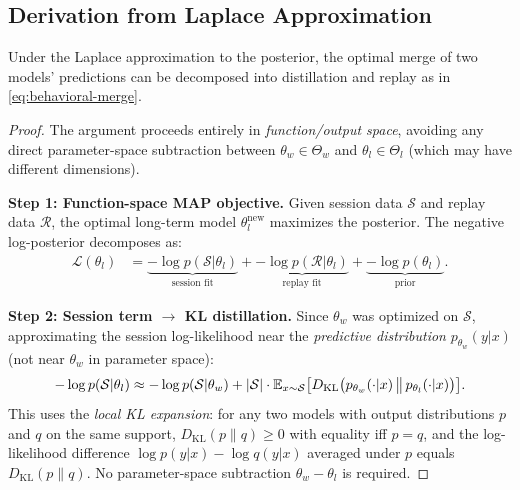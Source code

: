 \subsection{Derivation from Laplace Approximation}

\begin{proposition}
\label{prop:behavioral-merge}
Under the Laplace approximation to the posterior, the optimal merge of
two models' predictions can be decomposed into distillation and replay
as in \eqref{eq:behavioral-merge}.
\end{proposition}

\begin{proof}
The argument proceeds entirely in \emph{function/output space},
avoiding any direct parameter-space subtraction between
$\theta_w \in \Theta_w$ and $\theta_l \in \Theta_l$ (which may have
different dimensions).

\textbf{Step 1: Function-space MAP objective.}
Given session data $\mathcal{S}$ and replay data $\mathcal{R}$, the
optimal long-term model $\theta_l^{\mathrm{new}}$ maximizes the
posterior. The negative log-posterior decomposes as:
\begin{align*}
  \mathcal{L}(\theta_l)
  &= \underbrace{-\log p(\mathcal{S}|\theta_l)}_{\text{session fit}}
   + \underbrace{-\log p(\mathcal{R}|\theta_l)}_{\text{replay fit}}
   + \underbrace{-\log p(\theta_l)}_{\text{prior}}.
\end{align*}

\textbf{Step 2: Session term $\to$ KL distillation.}
Since $\theta_w$ was optimized on $\mathcal{S}$, approximating the
session log-likelihood near the \emph{predictive distribution}
$p_{\theta_w}(y|x)$ (not near $\theta_w$ in parameter space):
\[
  -\log p(\mathcal{S}|\theta_l)
  \approx -\log p(\mathcal{S}|\theta_w)
  + |\mathcal{S}|\cdot
  \mathbb{E}_{x \sim \mathcal{S}}\bigl[
    D_{\mathrm{KL}}\bigl(p_{\theta_w}(\cdot|x)
    \,\big\|\, p_{\theta_l}(\cdot|x)\bigr)
  \bigr].
\]
This uses the \emph{local KL expansion}: for any two models with
output distributions $p$ and $q$ on the same support,
$D_{\mathrm{KL}}(p\|q) \geq 0$ with equality iff $p = q$, and
the log-likelihood difference $\log p(y|x) - \log q(y|x)$ averaged
under $p$ equals $D_{\mathrm{KL}}(p\|q)$.
No parameter-space subtraction $\theta_w - \theta_l$ is required.


\end{proof}
